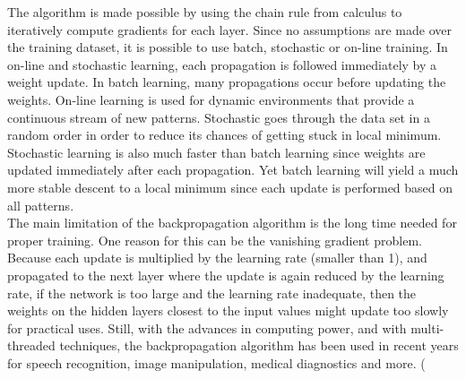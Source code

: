 \documentclass[12pt,oneside]{CUNY_CS_PhD}
\begin{document}
The algorithm is made possible by using the chain rule from calculus to iteratively compute gradients for each layer. Since no assumptions are made over the training dataset, it is possible to use batch, stochastic or on-line training. In on-line and stochastic learning, each propagation is followed immediately by a weight update. In batch learning, many propagations occur before updating the weights. On-line learning is used for dynamic environments that provide a continuous stream of new patterns. Stochastic goes through the data set in a random order in order to reduce its chances of getting stuck in local minimum. Stochastic learning is also much faster than batch learning since weights are updated immediately after each propagation. Yet batch learning will yield a much more stable descent to a local minimum since each update is performed based on all patterns.\\
The main limitation of the backpropagation algorithm is the long time needed for proper training. One reason for this can be the vanishing gradient problem.
Because each update is multiplied by the learning rate (smaller than 1), and propagated to the next layer where the update is again reduced by the learning rate, if the network is too large and the learning rate inadequate, then the weights on the hidden layers closest to the input values might update too slowly for practical uses. 
Still, with the advances in computing power, and with multi-threaded techniques, the backpropagation algorithm has been used in recent years for speech recognition, image manipulation, medical diagnostics and more.
(%
\end{document}
